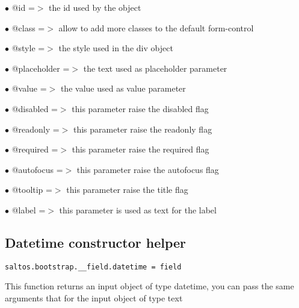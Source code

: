 \documentclass[a4paper]{book}
\begin{document}
\begin{compactitem}
\item[\color{myblue}$\bullet$] @id          =$>$ the id used by the object
\item[\color{myblue}$\bullet$] @class       =$>$ allow to add more classes to the default form-control
\item[\color{myblue}$\bullet$] @style       =$>$ the style used in the div object
\item[\color{myblue}$\bullet$] @placeholder =$>$ the text used as placeholder parameter
\item[\color{myblue}$\bullet$] @value       =$>$ the value used as value parameter
\item[\color{myblue}$\bullet$] @disabled    =$>$ this parameter raise the disabled flag
\item[\color{myblue}$\bullet$] @readonly    =$>$ this parameter raise the readonly flag
\item[\color{myblue}$\bullet$] @required    =$>$ this parameter raise the required flag
\item[\color{myblue}$\bullet$] @autofocus   =$>$ this parameter raise the autofocus flag
\item[\color{myblue}$\bullet$] @tooltip     =$>$ this parameter raise the title flag
\item[\color{myblue}$\bullet$] @label       =$>$ this parameter is used as text for the label
\end{compactitem}

\hypertarget{toc442}{}
\subsection{Datetime constructor helper}

\begin{lstlisting}
saltos.bootstrap.__field.datetime = field
\end{lstlisting}

This function returns an input object of type datetime, you can pass the same arguments
that for the input object of type text
\end{document}
